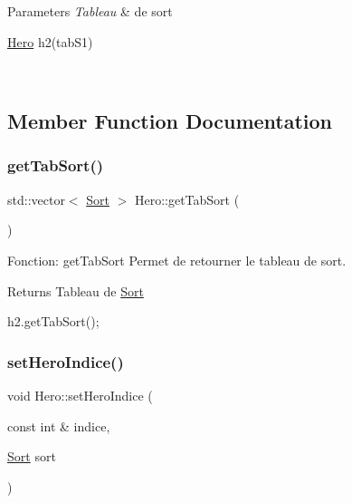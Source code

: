 \begin{DoxyParams}{Parameters}
{\em Tableau} & de sort 
\begin{DoxyCode}
\hyperlink{classHero}{Hero} h2(tabS1)
\end{DoxyCode}
 \\
\hline
\end{DoxyParams}


\subsection{Member Function Documentation}
\mbox{\label{classHero_ab596535fb4e3aeb836bd23780220455b}} 
\subsubsection{\texorpdfstring{get\+Tab\+Sort()}{getTabSort()}}
{\footnotesize\ttfamily std\+::vector$<$ \hyperlink{classSort}{Sort} $>$ Hero\+::get\+Tab\+Sort (\begin{DoxyParamCaption}{ }\end{DoxyParamCaption})}



Fonction\+: get\+Tab\+Sort Permet de retourner le tableau de sort. 

\begin{DoxyReturn}{Returns}
Tableau de \hyperlink{classSort}{Sort} 
\begin{DoxyCode}
h2.getTabSort();
\end{DoxyCode}
 
\end{DoxyReturn}
\mbox{\label{classHero_a48cd72ba539d261504a582a63d7c9e5f}} 
\subsubsection{\texorpdfstring{set\+Hero\+Indice()}{setHeroIndice()}}
{\footnotesize\ttfamily void Hero\+::set\+Hero\+Indice (\begin{DoxyParamCaption}\item[{const int \&}]{indice,  }\item[{\hyperlink{classSort}{Sort}}]{sort }\end{DoxyParamCaption})}



